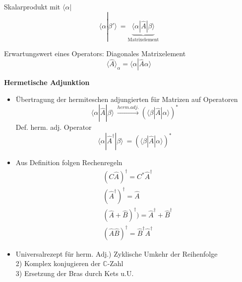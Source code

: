 \documentclass[10pt,article,colorback,accentcolor=tud9d]{scrartcl}
\begin{document}
\begin{itemize}
\begin{fleqn}
\begin{equation}
  \end{equation}
  Skalarprodukt mit $\langle \alpha \left|\right.$
  \begin{equation}
  \langle \alpha\left|\right.\beta'\rangle  \ = \underbrace{\langle \alpha\left|\right.\hat{A}\left
|\right.\beta\rangle }_{\text{Matrixelement}}
  \end{equation}
\item Erwartungswert eines Operators: Diagonales Matrixelement
  \begin{equation}
  \langle \hat{A}\rangle _\alpha = \langle \alpha \left|\right.\hat{A} \alpha\rangle 
  \end{equation}
\end{fleqn}
\end{itemize}
\textbf{Hermetische Adjunktion}
\begin{fleqn}
\begin{itemize}
\item Übertragung der hermiteschen adjungierten für Matrizen auf Operatoren
  \begin{equation}
  \langle \alpha\left|\right.\hat{A}\left|\right.\beta\rangle  \ \xrightarrow{herm. adj.} (\langle 
\beta \left|\right.\hat{A}\left|\right.\alpha\rangle )^*
  \end{equation}
  Def. herm. adj. Operator
  \begin{equation}
  \langle \alpha\left|\right.{\hat{A}}^{\dagger} \left|\right. \beta\rangle  \ =(\langle \beta\left|\right.
\hat{A}\left|\right.\alpha\rangle )^*
  \end{equation}
\item Aus Definition folgen Rechenregeln
  \begin{equation}
  \begin{aligned}
  &(C\hat{A})^{\dagger}=C^*{\hat{A}}^{\dagger}\\
  &({\hat{A}}^{\dagger})^{\dagger}=\hat{A}\\
  &(\hat{A} + \hat{B})^{\dagger} )= \hat{A}^{\dagger} + \hat{B}^{\dagger}\\
  &(\hat{A}\hat{B})^{\dagger}=\hat{B}^{\dagger}\hat{A}^{\dagger}
  \end{aligned}
  \end{equation}
\item \onehalfspacing Universalrezept für herm. Adj.) Zyklische Umkehr der Reihenfolge\\
  2) Komplex konjugieren der $\mathbb{C}$-Zahl\\
  3) Ersetzung der Bras durch Kets u.U.\\

\end{itemize}
\end{fleqn}
\end{document}
